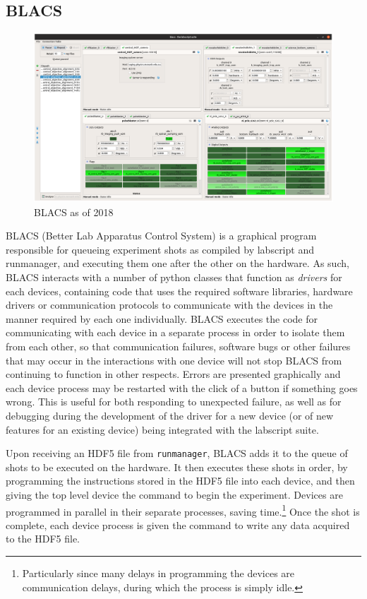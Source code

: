 \subsection{BLACS}

\begin{figure}
\begin{center}
\includegraphics[width=\textwidth]{figures/software/new_screenshots/blacs.png}
\caption{BLACS as of 2018}\label{fig:blacs}
\end{center}
\end{figure}

BLACS (Better Lab Apparatus Control System) is a graphical program responsible for queueing experiment shots as compiled by labscript and runmanager, and executing them one after the other on the hardware. As such, BLACS interacts with a number of python classes that function as \emph{drivers} for each devices, containing code that uses the required software libraries, hardware drivers or communication protocols to communicate with the devices in the manner required by each one individually. BLACS executes the code for communicating with each device in a separate process in order to isolate them from each other, so that communication failures, software bugs or other failures that may occur in the interactions with one device will not stop BLACS from continuing to function in other respects. Errors are presented graphically and each device process may be restarted with the click of a button if something goes wrong. This is useful for both responding to unexpected failure, as well as for debugging during the development of the driver for a new device (or of new features for an existing device) being integrated with the labscript suite.

Upon receiving an HDF5 file from \texttt{runmanager}, BLACS adds it to the queue of shots to be executed on the hardware. It then executes these shots in order, by programming the instructions stored in the HDF5 file into each device, and then giving the top level device the command to begin the experiment. Devices are programmed in parallel in their separate processes, saving time.\footnote{Particularly since many delays in programming the devices are communication delays, during which the process is simply idle.} Once the shot is complete, each device process is given the command to write any data acquired to the HDF5 file.


